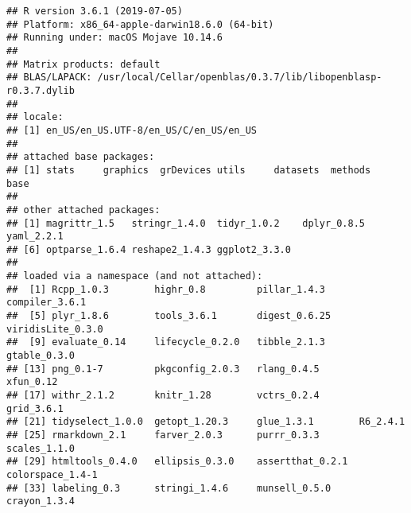 \documentclass[]{article}
\begin{document}
\begin{verbatim}
## R version 3.6.1 (2019-07-05)
## Platform: x86_64-apple-darwin18.6.0 (64-bit)
## Running under: macOS Mojave 10.14.6
## 
## Matrix products: default
## BLAS/LAPACK: /usr/local/Cellar/openblas/0.3.7/lib/libopenblasp-r0.3.7.dylib
## 
## locale:
## [1] en_US/en_US.UTF-8/en_US/C/en_US/en_US
## 
## attached base packages:
## [1] stats     graphics  grDevices utils     datasets  methods   base     
## 
## other attached packages:
## [1] magrittr_1.5   stringr_1.4.0  tidyr_1.0.2    dplyr_0.8.5    yaml_2.2.1    
## [6] optparse_1.6.4 reshape2_1.4.3 ggplot2_3.3.0 
## 
## loaded via a namespace (and not attached):
##  [1] Rcpp_1.0.3        highr_0.8         pillar_1.4.3      compiler_3.6.1   
##  [5] plyr_1.8.6        tools_3.6.1       digest_0.6.25     viridisLite_0.3.0
##  [9] evaluate_0.14     lifecycle_0.2.0   tibble_2.1.3      gtable_0.3.0     
## [13] png_0.1-7         pkgconfig_2.0.3   rlang_0.4.5       xfun_0.12        
## [17] withr_2.1.2       knitr_1.28        vctrs_0.2.4       grid_3.6.1       
## [21] tidyselect_1.0.0  getopt_1.20.3     glue_1.3.1        R6_2.4.1         
## [25] rmarkdown_2.1     farver_2.0.3      purrr_0.3.3       scales_1.1.0     
## [29] htmltools_0.4.0   ellipsis_0.3.0    assertthat_0.2.1  colorspace_1.4-1 
## [33] labeling_0.3      stringi_1.4.6     munsell_0.5.0     crayon_1.3.4
\end{verbatim}

\normalsize
\end{document}
